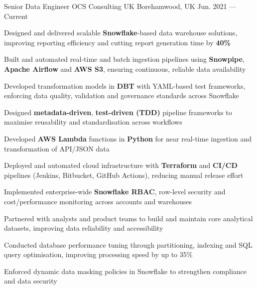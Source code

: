 
\begin{cventries}

  \cventry
  {Senior Data Engineer} %
  {OCS Consulting {\color{awesome-nephritis} UK} } %
  {Borehamwood, UK} %
  {Jun. 2021 --- Current} %
  {
    \begin{cvitems}
    \item {Designed and delivered scalable \textbf{Snowflake}-based data warehouse solutions, improving reporting efficiency and cutting report generation time by \textbf{40\%}}
    \item {Built and automated real-time and batch ingestion pipelines using \textbf{Snowpipe}, \textbf{Apache Airflow} and \textbf{AWS S3}, ensuring continuous, reliable data availability}
    \item {Developed transformation models in \textbf{DBT} with YAML-based test frameworks, enforcing data quality, validation and governance standards across Snowflake}
    \item {Designed \textbf{metadata-driven}, \textbf{test-driven (TDD)} pipeline frameworks to maximise reusability and standardisation across workflows}
    \item {Developed \textbf{AWS Lambda} functions in \textbf{Python} for near real-time ingestion and transformation of API/JSON data}
    \item {Deployed and automated cloud infrastructure with \textbf{Terraform} and \textbf{CI/CD} pipelines (Jenkins, Bitbucket, GitHub Actions), reducing manual release effort}
    \item {Implemented enterprise-wide \textbf{Snowflake RBAC}, row-level security and cost/performance monitoring across accounts and warehouses}
    \item {Partnered with analysts and product teams to build and maintain core analytical datasets, improving data reliability and accessibility}
    \item {Conducted database performance tuning through partitioning, indexing and SQL query optimisation, improving processing speed by up to 35\%}
    \item {Enforced dynamic data masking policies in Snowflake to strengthen compliance and data security}
    \end{cvitems}
  }


\end{cventries}
